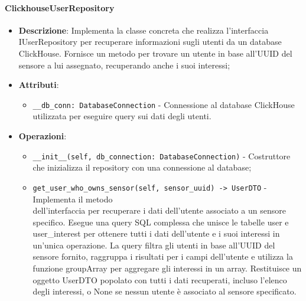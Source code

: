 \documentclass[10pt]{article}
\begin{document}
    \paragraph{ClickhouseUserRepository}
    \begin{itemize} 
    \item \textbf{Descrizione}: Implementa la classe concreta che realizza l'interfaccia IUserRepository per recuperare informazioni sugli utenti da un database ClickHouse. Fornisce un metodo per trovare un utente in base all'UUID del sensore a lui assegnato, recuperando anche i suoi interessi;
    \item \textbf{Attributi}:
    \begin{itemize}
        \item \texttt{\_\_db\_conn: DatabaseConnection} - Connessione al database ClickHouse utilizzata per eseguire query sui dati degli utenti.
    \end{itemize}
    
    \item \textbf{Operazioni}:
    \begin{itemize}
        \item \texttt{\_\_init\_\_(self, db\_connection: DatabaseConnection)} - Costruttore che inizializza il repository con una connessione al database;
        
        \item \texttt{get\_user\_who\_owns\_sensor(self, sensor\_uuid) -> UserDTO} - Implementa il metodo\\ dell'interfaccia per recuperare i dati dell'utente associato a un sensore specifico. Esegue una query SQL complessa che unisce le tabelle user e user\_interest per ottenere tutti i dati dell'utente e i suoi interessi in un'unica operazione. La query filtra gli utenti in base all'UUID del sensore fornito, raggruppa i risultati per i campi dell'utente e utilizza la funzione groupArray per aggregare gli interessi in un array. Restituisce un oggetto UserDTO popolato con tutti i dati recuperati, incluso l'elenco degli interessi, o None se nessun utente è associato al sensore specificato.
    \end{itemize}
    \end{itemize}
\end{document}
